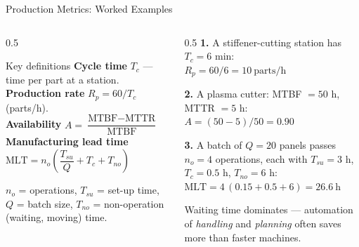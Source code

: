 \documentclass[aspectratio=169]{beamer}
\begin{document}
	\begin{frame}{Production Metrics: Worked Examples}
		\begin{columns}[T]
			\begin{column}{0.5\textwidth}
				\begin{block}{Key definitions}
					\small
					\textbf{Cycle time} $T_c$ --- time per part at a station.\\
					\textbf{Production rate} $R_p = 60/T_c$ (parts/h).\\
					\textbf{Availability} $A = \dfrac{\text{MTBF} - \text{MTTR}}{\text{MTBF}}$\\[3pt]
					\textbf{Manufacturing lead time}\\
					$\text{MLT} = n_o\left(\dfrac{T_{su}}{Q} + T_c + T_{no}\right)$
				\end{block}
				\footnotesize $n_o$ = operations, $T_{su}$ = set-up time, $Q$ = batch size, $T_{no}$ = non-operation (waiting, moving) time.
			\end{column}
			\begin{column}{0.5\textwidth}
				\small
				\textbf{1.} A stiffener-cutting station has $T_c = 6$ min:\\
				$R_p = 60/6 = \boxed{10\ \text{parts/h}}$
				\vspace{0.15cm}

				\textbf{2.} A plasma cutter: MTBF $= 50$ h, MTTR $= 5$ h:\\
				$A = (50 - 5)/50 = \boxed{0.90}$
				\vspace{0.15cm}

				\textbf{3.} A batch of $Q = 20$ panels passes $n_o = 4$ operations, each with $T_{su} = 3$ h, $T_c = 0.5$ h, $T_{no} = 6$ h:\\
				$\text{MLT} = 4\,(0.15 + 0.5 + 6) = \boxed{26.6\ \text{h}}$
				\vspace{0.1cm}

				\footnotesize Waiting time dominates --- automation of \emph{handling} and \emph{planning} often saves more than faster machines.
			\end{column}
		\end{columns}
	\end{frame}
\end{document}
